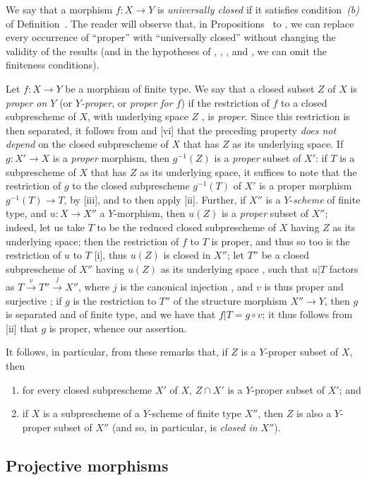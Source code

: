 \begin{rmk}[5.4.9]
\label{2.5.4.9}
We say that a morphism $f:X\to Y$ is \emph{universally closed} if it satisfies condition~\emph{(b)} of Definition~.
The reader will observe that,
in Propositions~ to , we can replace every occurrence of ``proper'' with ``universally closed'' without changing the validity of the results (and in the hypotheses of , , , and , we can omit the finiteness conditions).
\end{rmk}

\begin{env}[5.4.10]
\label{2.5.4.10}
Let $f:X\to Y$ be a morphism of finite type.
We say that a closed subset $Z$ of $X$ is \emph{proper on $Y$} (or \emph{$Y$-proper}, or \emph{proper for $f$}) if the restriction of $f$ to a closed subprescheme of $X$, with underlying space $Z$ , is \emph{proper}.
Since this restriction is then separated, it follows from  and [vi] that the preceding property \emph{does not depend} on the closed subprescheme of $X$ that has $Z$ as its underlying space.
If $g:X'\to X$ is a \emph{proper} morphism, then $g^{-1}(Z)$ is a \emph{proper} subset of $X'$:
if $T$ is a subprescheme of $X$ that has $Z$ as its underlying space, it suffices to note that the restriction of $g$ to the closed subprescheme $g^{-1}(T)$ of $X'$ is a proper morphism $g^{-1}(T)\to T$, by [iii], and to then apply [ii].
Further, if $X''$ is a $Y$-\emph{scheme} of finite type, and $u:X\to X''$ a $Y$-morphism, then $u(Z)$ is a \emph{proper} subset of $X''$;
indeed, let us take $T$ to be the reduced closed subprescheme of $X$ having $Z$ as its underlying space;
then the restriction of $f$ to $T$ is proper, and thus so too is the restriction of $u$ to $T$ [i], thus $u(Z)$ is closed in $X''$;
let $T''$ be a closed subprescheme of $X''$ having $u(Z)$ as its underlying space , such that $u|T$ factors as $T\xrightarrow{v}T''\xrightarrow{j}X''$, where $j$ is the canonical injection , and $v$ is thus proper and surjective ;
if $g$ is the restriction to $T''$ of the structure morphism $X''\to Y$, then $g$ is separated and of finite type, and we have that $f|T=g\circ v$;
it thus follows from [ii] that $g$ is proper, whence our assertion.
\end{env}

It follows, in particular, from these remarks that, if $Z$ is a $Y$-proper subset of $X$, then
\begin{enumerate}
    \item for every closed subprescheme $X'$ of $X$, $Z\cap X'$ is a $Y$-proper subset of $X'$; and
    \item if $X$ is a subprescheme of a $Y$-scheme of finite type $X''$, then $Z$ is also a $Y$-proper subset of $X''$ (and so, in particular, is \emph{closed in $X''$}).
\end{enumerate}

\subsection{Projective morphisms}
\label{subsection:projective-morphisms}
